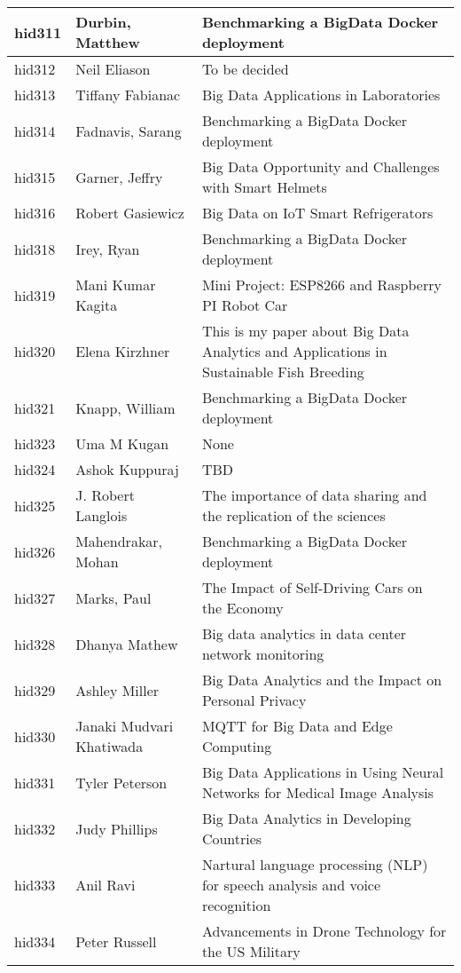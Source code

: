 \documentclass[12pt]{book}
\begin{document}
\begin{footnotesize}
\begin{longtable}{|p{1cm}p{5cm}p{9cm}|}
\hline
hid311 & Durbin, Matthew & Benchmarking a BigData Docker deployment  \\
\hline
hid312 & Neil Eliason & To be decided  \\
\hline
hid313 & Tiffany Fabianac & Big Data Applications in Laboratories  \\
\hline
hid314 & Fadnavis, Sarang & Benchmarking a BigData Docker deployment  \\
\hline
hid315 & Garner, Jeffry & Big Data Opportunity and Challenges with Smart Helmets  \\
\hline
hid316 & Robert Gasiewicz & Big Data on IoT Smart Refrigerators  \\
\hline
hid318 & Irey, Ryan & Benchmarking a BigData Docker deployment  \\
\hline
hid319 & Mani Kumar Kagita & Mini Project: ESP8266 and Raspberry PI Robot Car  \\
\hline
hid320 & Elena Kirzhner & This is my paper about Big Data Analytics and Applications in Sustainable Fish Breeding  \\
\hline
hid321 & Knapp, William & Benchmarking a BigData Docker deployment  \\
\hline
hid323 & Uma M Kugan & None  \\
\hline
hid324 & Ashok Kuppuraj & TBD  \\
\hline
hid325 & J. Robert Langlois & The importance of data sharing and the replication of the sciences  \\
\hline
hid326 & Mahendrakar, Mohan & Benchmarking a BigData Docker deployment  \\
\hline
hid327 & Marks, Paul & The Impact of Self-Driving Cars on the Economy  \\
\hline
hid328 & Dhanya Mathew & Big data analytics in data center network monitoring  \\
\hline
hid329 & Ashley Miller & Big Data Analytics and the Impact on Personal Privacy  \\
\hline
hid330 & Janaki Mudvari Khatiwada & MQTT for Big Data and Edge Computing  \\
\hline
hid331 & Tyler Peterson & Big Data Applications in Using Neural Networks for Medical Image Analysis  \\
\hline
hid332 & Judy Phillips & Big Data Analytics in Developing Countries  \\
\hline
hid333 & Anil Ravi & Nartural language processing (NLP) for speech analysis and voice recognition  \\
\hline
hid334 & Peter Russell & Advancements in Drone Technology for the US Military  \\

\end{longtable}
\end{footnotesize}
\end{document}
